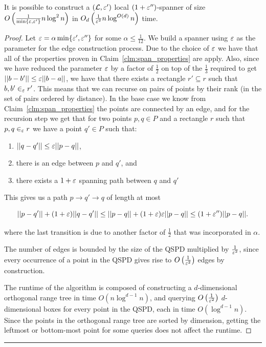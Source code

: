 \documentclass[12pt]{article}%
\begin{document}
    \begin{claim}
	It is possible to construct a $(\mathcal{L}, \varepsilon')$ local
        $(1+\varepsilon'')$-spanner of size
        $O\left(\frac{1}{\min\{\varepsilon, \varepsilon'\}}n\log^2n\right)$ in
        $O_d\left(\frac{1}{\varepsilon^2}n\log^{O(d)}n\right)$ time.
    \end{claim}

\begin{proof} 
    Let $\varepsilon = \alpha \min \{\varepsilon',\varepsilon''\}$ for some
    $\alpha \leq \frac{1}{12}$. We build a spanner using $\varepsilon$ as the
    parameter for the edge construction process. Due to the choice of
    $\varepsilon$ we have that all of the properties proven in
    Claim~\ref{clm:span_properties} are apply. Also, since we have
    reduced the parameter $\varepsilon$ by a factor of $\frac{1}{2}$ on top
    of the $\frac{1}{3}$ required to get $||b-b'||\leq \varepsilon ||b-a||$,
    we have that there exists a rectangle $r'\subseteq r$ such that
    $b,b'\in_{\varepsilon}r'$. This means that we can recurse on pairs of
    points by their rank (in the set of pairs ordered by distance). In
    the base case we know from Claim~\ref{clm:span_properties} the
    points are connected by an edge, and for the recursion step we get
    that for two points $p,q\in P$ and a rectangle $r$ such that
    $p,q\in_{\varepsilon} r$ we have a point $q'\in P$ such that:
    \begin{enumerate}
        \item $||q-q'||\leq \varepsilon||p-q||$,
        \item there is an edge between $p$ and $q'$, and
        \item there exists a $1+\varepsilon$ spanning path between $q$ and
        $q'$
    \end{enumerate}

    This gives us a path $p\rightarrow q' \rightarrow q$ of length at
    most
	
	\begin{equation}
            ||p-q'||+(1+\varepsilon)||q-q'||\leq
            ||p-q||+(1+\varepsilon)\varepsilon||p-q||\leq (1+\varepsilon'')||p-q||.
        \end{equation}
	
	where the last transition is due to another factor of
        $\frac{1}{2}$ that was incorporated in $\alpha$.
	
	The number of edges is bounded by the size of the QSPD
        multiplied by $\frac{1}{\varepsilon^2}$, since every occurrence of a
        point in the QSPD gives rise to
        $O\left(\frac{1}{\varepsilon^2}\right)$ edges by construction.
	
	The runtime of the algorithm is composed of constructing a
        $d$-dimensional orthogonal range tree in time
        $O(n\log^{d-1}n)$, and querying
        $O\left(\frac{1}{\varepsilon^2}\right)$ $d$-dimensional boxes for
        every point in the QSPD, each in time $O(\log^{d-1}n)$. Since
        the points in the orthogonal range tree are sorted by
        dimension, getting the leftmost or bottom-most point for some
        queries does not affect the runtime.
	
\end{proof}
\hrule
\end{document}
